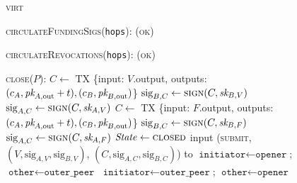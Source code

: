 \begin{figure}[H]
  \begin{processbox}{\textsc{virt}}
    \begin{algorithmic}[1]
      \State \textsc{circulateFundingSigs}(\texttt{hops}):
      \Indent
        \State \Return (\textsc{ok})
      \EndIndent
      \Statex

      \State \textsc{circulateRevocations}(\texttt{hops}):
      \Indent
        \State \Return (\textsc{ok})
      \EndIndent
      \Statex

      \State \textsc{close}($P$):
            \State {}
            \State $C \gets$ TX \{input: $V$.output, outputs: $(c_A, \textit{pk}_{A,
            \mathrm{out}} + t), (c_B, \textit{pk}_{B, \mathrm{out}})$\}
            \State $\mathrm{sig}_{B, C} \gets \textsc{sign}(C, \textit{sk}_{B, V})$
            \State $\mathrm{sig}_{A, C} \gets \textsc{sign}(C, \textit{sk}_{A, V})$
          \Else
            \State $C \gets$ TX \{input: $F$.output, outputs: $(c_A, \textit{pk}_{A,
            \mathrm{out}} + t), (c_B, \textit{pk}_{B, \mathrm{out}})$\}
            \State $\mathrm{sig}_{B, C} \gets \textsc{sign}(C, \textit{sk}_{B, F})$
            \State $\mathrm{sig}_{A, C} \gets \textsc{sign}(C, \textit{sk}_{A, F})$
          \EndIf
        \EndIf \: 
        \State $\mathit{State} \gets \textsc{closed}$
          \State input (\textsc{submit}, $(V, \mathrm{sig}_{A, V},
          \mathrm{sig}_{B, V})$, $(C, \mathrm{sig}_{A, C}, \mathrm{sig}_{B,
          C})$) to \ledger
        \Else \: 
            \State $\texttt{initiator} \gets \texttt{opener}$; $\texttt{other}
            \gets \texttt{outer\_peer}$
          \Else \: 
            \State $\texttt{initiator} \gets \texttt{outer\_peer}$;
            $\texttt{other} \gets \texttt{opener}$
          \EndIf
              \State {}
\end{algorithmic}
\end{processbox}
\end{figure}
